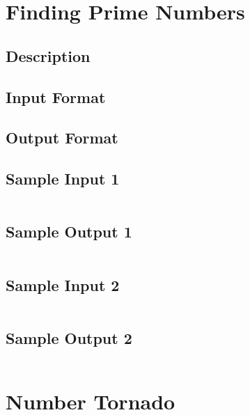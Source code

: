 

\section{Finding Prime Numbers}

\subsection*{Description}

\subsection*{Input Format}

\subsection*{Output Format}

\subsection*{Sample Input 1}
\begin{verbatim}
\end{verbatim}

\subsection*{Sample Output 1}
\begin{verbatim}
\end{verbatim}

\subsection*{Sample Input 2}
\begin{verbatim}
\end{verbatim}

\subsection*{Sample Output 2}
\begin{verbatim}
\end{verbatim}


\newpage

\section{Number Tornado}

